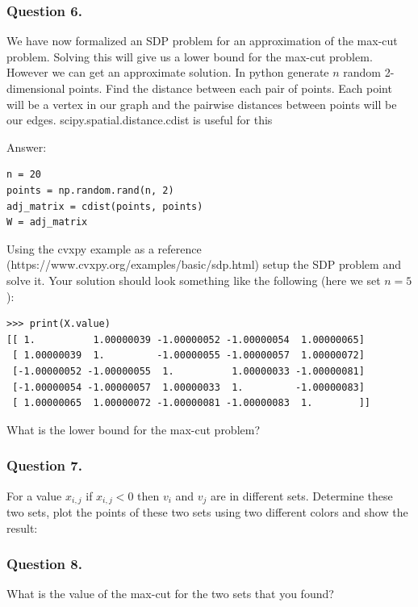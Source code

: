 \documentclass{article}
\begin{document}
\subsubsection{Question 6.}
We have now formalized an SDP problem for an approximation of the max-cut problem. Solving this will give us a lower bound for the max-cut problem. However we can get an approximate solution.
In python generate \( n \) random 2-dimensional points.
Find the distance between each pair of points. Each point will be a vertex in our graph and the pairwise distances between points will be our edges.
scipy.spatial.distance.cdist is useful for this

Answer:
\begin{verbatim}
n = 20
points = np.random.rand(n, 2)
adj_matrix = cdist(points, points)
W = adj_matrix
\end{verbatim}

Using the cvxpy example as a reference (https://www.cvxpy.org/examples/basic/sdp.html) setup the SDP problem and solve it.
Your solution should look something like the following (here we set \( n = 5 \)):

\begin{verbatim}
>>> print(X.value)
[[ 1.          1.00000039 -1.00000052 -1.00000054  1.00000065]
 [ 1.00000039  1.         -1.00000055 -1.00000057  1.00000072]
 [-1.00000052 -1.00000055  1.          1.00000033 -1.00000081]
 [-1.00000054 -1.00000057  1.00000033  1.         -1.00000083]
 [ 1.00000065  1.00000072 -1.00000081 -1.00000083  1.        ]]
\end{verbatim}

What is the lower bound for the max-cut problem?

\subsubsection{Question 7.}
For a value \( x_{i, j} \) if \( x_{i, j} < 0 \) then \( v_i \) and \( v_j \) are in different sets.
Determine these two sets, plot the points of these two sets using two different colors and show the result:

\subsubsection{Question 8.}
What is the value of the max-cut for the two sets that you found?
\end{document}

